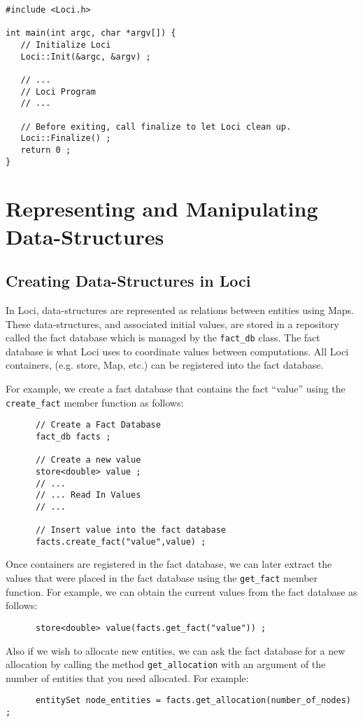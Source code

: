 \documentclass[10pt,epsf]{book}
\begin{document}
\begin{verbatim}
#include <Loci.h>

int main(int argc, char *argv[]) {
   // Initialize Loci
   Loci::Init(&argc, &argv) ;

   // ...
   // Loci Program
   // ...

   // Before exiting, call finalize to let Loci clean up.
   Loci::Finalize() ;
   return 0 ;
}
\end{verbatim}

\chapter{Representing and Manipulating Data-Structures}
\section{Creating Data-Structures in Loci}

In Loci, data-structures are represented as relations between entities
using Maps.  These data-structures, and associated initial values, are
stored in a repository called the fact database which is managed by
the {\tt fact\_db} class.  The fact database is what Loci uses to
coordinate values between computations.  All Loci containers, (e.g.
store, Map, etc.) can be registered into the fact database.

For example, we create a fact database that contains the fact ``value'' using the {\tt create\_fact} member function as follows:
\begin{verbatim}
      // Create a Fact Database
      fact_db facts ;

      // Create a new value
      store<double> value ;
      // ...
      // ... Read In Values
      // ...
   
      // Insert value into the fact database
      facts.create_fact("value",value) ;
\end{verbatim}

Once containers are registered in the fact database, we can later
extract the values that were placed in the fact database using the 
{\tt get\_fact} member function.  For example, we can obtain the
current values from the fact database as follows:
\begin{verbatim}
      store<double> value(facts.get_fact("value")) ;
\end{verbatim}

Also if we wish to allocate new entities, we can ask the fact database
for a new allocation by calling the method {\tt get\_allocation} with
an argument of the number of entities that you need allocated.  For
example:
\begin{verbatim}
      entitySet node_entities = facts.get_allocation(number_of_nodes) ;
\end{verbatim}
\end{document}
